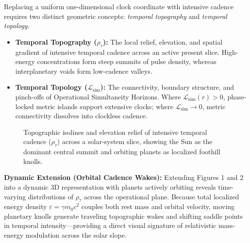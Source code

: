 \documentclass[11pt,a4paper]{article}
\theoremstyle{remark}
\begin{document}
Replacing a uniform one-dimensional clock coordinate with intensive cadence requires two distinct geometric concepts: \emph{temporal topography} and \emph{temporal topology}.
\begin{itemize}
    \item \textbf{Temporal Topography ($\rho_\tau$):} The local relief, elevation, and spatial gradient of intensive temporal cadence across an active present slice. High-energy concentrations form steep summits of pulse density, whereas interplanetary voids form low-cadence valleys.
    \item \textbf{Temporal Topology ($\mathcal{L}_{\mathrm{sim}}$):} The connectivity, boundary structure, and pinch-offs of Operational Simultaneity Horizons. Where $\mathcal{L}_{\mathrm{sim}}(r) > 0$, phase-locked metric islands support extensive clocks; where $\mathcal{L}_{\mathrm{sim}} \to 0$, metric connectivity dissolves into clockless cadence.
\end{itemize}

\begin{figure}[htbp]
\centering
\caption{Topographic isolines and elevation relief of intensive temporal cadence ($\rho_\tau$) across a solar-system slice, showing the Sun as the dominant central summit and orbiting planets as localized foothill knolls.}
\label{fig:solar_topography}
\end{figure}

\textbf{Dynamic Extension (Orbital Cadence Wakes):} Extending Figures 1 and 2 into a dynamic 3D representation with planets actively orbiting reveals time-varying distributions of $\rho_\tau$ across the operational plane. Because total localized energy density $\varepsilon = \gamma m_0 c^2$ couples both rest mass and orbital velocity, moving planetary knolls generate traveling topographic wakes and shifting saddle points in temporal intensity---providing a direct visual signature of relativistic mass-energy modulation across the solar slope.
\end{document}
